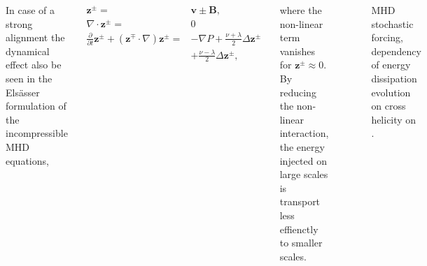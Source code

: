 \documentclass[20pt, a0paper, portrait, margin=15mm, innermargin=15mm,
     blockverticalspace=15mm, colspace=15mm, subcolspace=8mm]{tikzposter} %
\newcommand{\va}[1]{\bm{#1}}
\newcommand{\plot}[3]{
\begin{figure}[H]
    \centering
    \scriptsize
    \scalebox{1.3}{}
    \caption{\footnotesize{#2}}
    \label{#3}
\end{figure}
}
\begin{document}
\begin{columns}
{\begin{minipage}[t]{20cm}
            \end{minipage}
            \hfill
            \begin{minipage}[t]{20cm}

                In case of a strong alignment the dynamical effect also be seen in the
                Elsässer formulation of the incompressible MHD equations,

                \begin{equation}
                    \begin{aligned}
                    \label{elsasser_eq}
                    \va{z}^{\pm} = &\va{v} \pm \va{B},\\
                    \nabla \cdot \va{z}^{\pm} = &0\\
                    \frac{\partial}{\partial t} \va{z}^{\pm} + (\va{z}^{\mp}\cdot
                    \nabla)\va{z}^{\pm} = &-\nabla P + \frac{\nu + \lambda}{2}\Delta
                    \va{z}^{\pm} \\
                    &+ \frac{\nu - \lambda}{2}\Delta \va{z}^{\pm},
                    \end{aligned}
                \end{equation}

                where the non-linear term vanishes for $\va{z}^{\pm} \approx 0$.
                By reducing the non-linear interaction, the energy injected on
                large scales is transport less effienctly to smaller scales.

				\plot{figures/forcing/xhel_test_energy_flux_normed_t_05}
				{MHD stochastic forcing, dependency of energy dissipation evolution on cross helicity on .}
				{xhel_energy_dissipation_128}

            \end{minipage}
       }

\end{columns}
\end{document}
